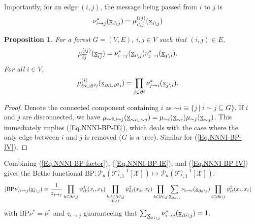 \documentclass[12pt]{article}
\newtheorem{proposition}[theorem]{Proposition}
\newcommand{\BS}{\backslash}
\newcommand{\UBX}{\underbar{\textbf{\normalfont x}}}
\newcommand{\BI}{{\bar{i}}}
\newcommand{\BJ}{{\bar{j}}}
\newcommand{\PI}{{\partial i}}
\newcommand{\PIN}{{\partial^2 i}}
\newcommand{\BIJ}{{\overline{ij}}}
\newcommand{\RA}{\rightarrow}
\newcommand{\X}{{\mathcal{X}}}
\newcommand{\TT}{{\mathcal{T}}}
\newcommand{\tree}[2]{\TT_{*, #1}^{#2}[\X]}
\numberwithin{equation}{section}
\begin{document}
Importantly, for an edge $(i, j)$, the message being passed from $i$ to $j$ is
\begin{equation}\label{Eq.NNNI-BP-MSG}
    \nu^*_{i\RA j}(\UBX_{\BI\BS j}) = \mu^{(ij)}_{\BI\BS j}(\UBX_{\BI\BS j})
\end{equation}

\begin{proposition}
    For a forest $G = (V, E)$, $i, j \in V$ such that $(i, j)\in E$,
    \begin{equation}\label{Eq.NNNI-BP-IE}
        \mu^{(ij)}_{\BIJ}(\UBX_{\BIJ})              = \nu^*_{i\RA j}(\UBX_{\BI\BS j})\nu^*_{j\RA i}(\UBX_{\BJ\BS i}).
    \end{equation}
    For all $i\in V$,
    \begin{equation}\label{Eq.NNNI-BP-IV}
        \mu^{(i)}_{\PI\cup\PIN}(\UBX_{\PI\cup\PIN}) = \prod_{j\in\PI}\nu^*_{j\RA i}(\UBX_{\BJ\BS i}).
    \end{equation}
\end{proposition}

\begin{proof}
    Denote the connected component containing $i$ as $\sim i \equiv \{j\ |\ i\sim j\subseteq G\}$. If $i$ and $j$ are disconnected, we have
    $\mu_{\sim i\cup \sim j}(\UBX_{\sim i\cup \sim j}) = \mu_{\sim i}(\UBX_{\sim i})\mu_{\sim j}(\UBX_{\sim j})$. This immediately implies (\ref{Eq.NNNI-BP-IE}), which deals with the case where the only edge between $i$ and $j$ is removed ($G$ is a tree). Similar for (\ref{Eq.NNNI-BP-IV}).
\end{proof}

Combining (\ref{Eq.NNNI-BP-factor}), (\ref{Eq.NNNI-BP-IE}), and (\ref{Eq.NNNI-BP-IV}) gives the Bethe functional $\text{BP}: \mathcal{P}_u(\tree{1}{\kappa-1})\mapsto \mathcal{P}_u(\tree{1}{\kappa-1})$:
\begin{equation}\label{Eq.NNNI-BP-F1}
    (\text{BP}\nu)_{i\RA j}(\UBX_{\BI\BS j}) \equiv \frac{1}{z_{i\RA j}} \prod_{k\in\PI\BS j} \psi^1_{ik}(x_i, x_k) \prod_{\substack{k, \ell\in\PI\BS j \\ k\neq \ell}} \psi^2_{k\ell}(x_k, x_\ell) \prod_{k\in\PI\BS j}\sum_{\UBX_{\partial k\BS i}}\nu_{k\RA i}(\UBX_{\partial k\BS i})\prod_{\ell\in\partial k\BS i} \psi^2_{i\ell}(x_i, x_\ell)
\end{equation}
with $\text{BP}\nu^* = \nu^*$ and $z_{i\RA j}$ guaranteeing that $\sum_{\UBX_{\PI\BS j}}\nu^*_{i\RA j}(\UBX_{\PI\BS j}) = 1$.
\end{document}
